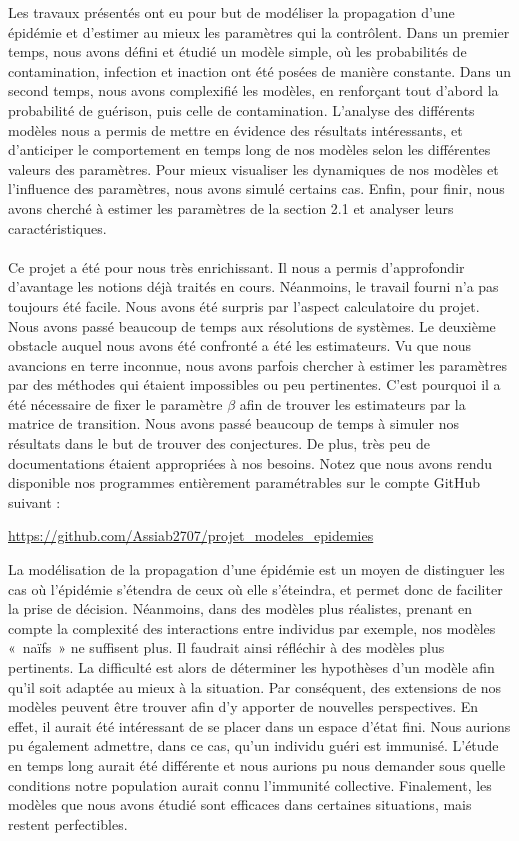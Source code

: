 \documentclass[12pt,a4paper]{report}
\theoremstyle{remark}
\begin{document}
Les travaux présentés ont eu pour but de modéliser la propagation d'une épidémie et d’estimer au mieux les paramètres qui la contrôlent. Dans un premier temps, nous avons défini et étudié un modèle simple, où les probabilités de contamination, infection et inaction ont été posées de manière constante. Dans un second temps, nous avons complexifié les modèles, en renforçant tout d’abord la probabilité de guérison, puis celle de  contamination. L’analyse des différents modèles nous a permis de mettre en évidence des résultats intéressants, et d’anticiper le comportement en temps long de nos modèles selon les différentes valeurs des paramètres. Pour mieux visualiser les dynamiques de nos modèles et l’influence des paramètres, nous avons simulé certains cas. Enfin, pour finir,  nous avons cherché à estimer les paramètres de la section 2.1 et analyser leurs caractéristiques.
\\
\\
Ce projet a été pour nous très enrichissant. Il nous a permis d’approfondir d’avantage les notions déjà traités en cours. Néanmoins, le travail fourni n’a pas toujours été facile. Nous avons été surpris par l'aspect calculatoire du projet. Nous avons passé beaucoup de temps aux résolutions de systèmes. Le deuxième obstacle auquel nous avons été confronté a été les estimateurs. Vu que nous avancions en terre inconnue, nous avons parfois chercher à estimer les paramètres par des méthodes qui étaient impossibles ou peu pertinentes. C’est pourquoi il a été nécessaire de fixer le paramètre $\beta$ afin de trouver les estimateurs par la matrice de transition. Nous avons passé beaucoup de temps à simuler nos résultats dans le but de trouver des conjectures. De plus, très peu de documentations étaient appropriées à nos besoins. Notez que nous avons rendu disponible nos programmes entièrement paramétrables sur le compte GitHub suivant :  
\begin{center}
    \url{https://github.com/Assiab2707/projet_modeles_epidemies}
\end{center}

La modélisation de la propagation d’une épidémie est un moyen de distinguer les cas où l’épidémie s’étendra de ceux où elle s’éteindra, et permet donc de faciliter la prise de décision. Néanmoins, dans des modèles plus réalistes, prenant en compte la complexité des interactions entre individus par exemple, nos modèles « naïfs » ne suffisent plus. Il faudrait ainsi réfléchir à des modèles plus pertinents. La difficulté est alors de déterminer les hypothèses d’un modèle afin qu’il soit adaptée au mieux à la situation. Par conséquent, des extensions de nos modèles peuvent être trouver afin d’y apporter de nouvelles perspectives. En effet, il aurait été intéressant de se placer dans un espace d’état fini. Nous aurions pu également admettre, dans ce cas, qu’un individu guéri est immunisé. L’étude en temps long aurait été différente et nous aurions pu nous demander sous quelle conditions notre population aurait connu l’immunité collective. Finalement, les modèles que nous avons étudié sont efficaces dans certaines situations, mais restent perfectibles.
\end{document}
